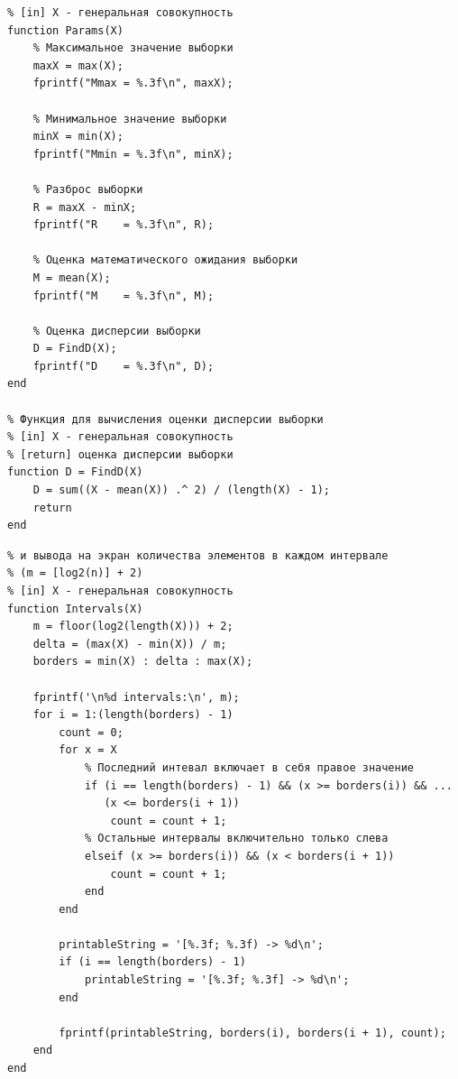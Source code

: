 \begin{lstlisting}[caption=Функция для вычисления параметров]
% Подсчет параметров выборки и вывода их на экран
% [in] X - генеральная совокупность
function Params(X)
    % Максимальное значение выборки
    maxX = max(X);
    fprintf("Mmax = %.3f\n", maxX);

    % Минимальное значение выборки
    minX = min(X);
    fprintf("Mmin = %.3f\n", minX);

    % Разброс выборки
    R = maxX - minX;
    fprintf("R    = %.3f\n", R);

    % Оценка математического ожидания выборки
    M = mean(X);
    fprintf("M    = %.3f\n", M);

    % Оценка дисперсии выборки
    D = FindD(X);
    fprintf("D    = %.3f\n", D);
end

% Функция для вычисления оценки дисперсии выборки
% [in] X - генеральная совокупность
% [return] оценка дисперсии выборки
function D = FindD(X)
    D = sum((X - mean(X)) .^ 2) / (length(X) - 1);
    return
end
\end{lstlisting}

\begin{lstlisting}[caption=Вычисление интервалов]
% Функция для группировки значений в m интервалов
% и вывода на экран количества элементов в каждом интервале
% (m = [log2(n)] + 2)
% [in] X - генеральная совокупность
function Intervals(X)
    m = floor(log2(length(X))) + 2;
    delta = (max(X) - min(X)) / m;
    borders = min(X) : delta : max(X);

    fprintf('\n%d intervals:\n', m);
    for i = 1:(length(borders) - 1)
        count = 0;
        for x = X
            % Последний интевал включает в себя правое значение
            if (i == length(borders) - 1) && (x >= borders(i)) && ...
               (x <= borders(i + 1))
                count = count + 1;
            % Остальные интервалы включительно только слева
            elseif (x >= borders(i)) && (x < borders(i + 1))
                count = count + 1;
            end
        end

        printableString = '[%.3f; %.3f) -> %d\n';
        if (i == length(borders) - 1)
            printableString = '[%.3f; %.3f] -> %d\n';
        end

        fprintf(printableString, borders(i), borders(i + 1), count);
    end
end
\end{lstlisting}

